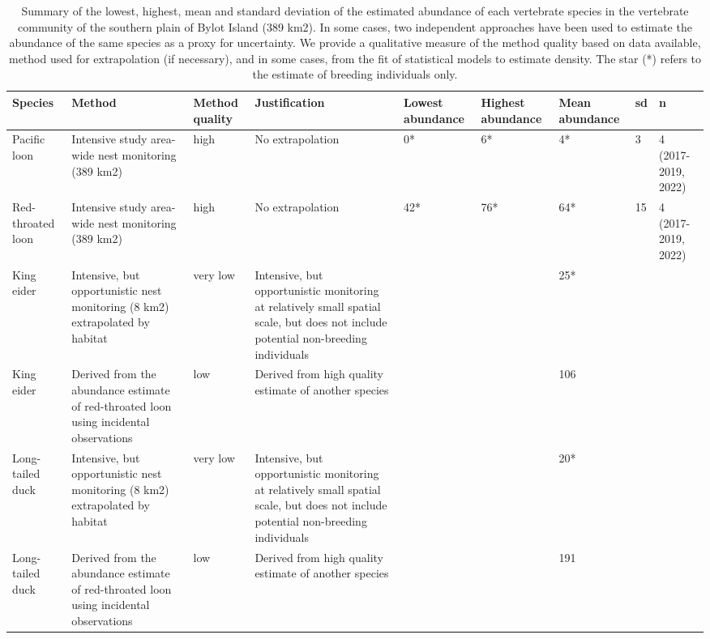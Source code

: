 \begingroup\fontsize{8pt}{10pt}\selectfont
\begin{longtable}{|p{}|p{}|p{}|p{}|p{}|p{}|p{}|p{}|p{}|}
\caption{Summary of the lowest, highest, mean and standard deviation of the estimated abundance of each vertebrate species in the vertebrate community of the southern plain of Bylot Island (389 km2). In some cases, two independent approaches have been used to estimate the abundance of the same species as a proxy for uncertainty. We provide a qualitative measure of the method quality based on data available, method used for extrapolation (if necessary), and in some cases, from the fit of statistical models to estimate density. The star (*) refers to the estimate of breeding individuals only.} \\ 
  \hline
{\textbf{Species}} & {\textbf{Method}} & {\textbf{Method quality}} & {\textbf{Justification}} & {\textbf{Lowest abundance}} & {\textbf{Highest abundance}} & {\textbf{Mean abundance}} & {\textbf{sd}} & {\textbf{n}} \\ 
  \hline
Pacific loon & Intensive study area-wide nest monitoring (389 km2) & high & No extrapolation & 0* & 6* & 4* & 3 & 4 (2017-2019, 2022) \\ 
   \hline
Red-throated loon & Intensive study area-wide nest monitoring (389 km2) & high & No extrapolation & 42* & 76* & 64* & 15 & 4 (2017-2019, 2022) \\ 
   \hline
King eider & Intensive, but opportunistic nest monitoring (8 km2) extrapolated by habitat & very low & Intensive, but opportunistic monitoring at relatively small spatial scale, but does not include potential non-breeding individuals &  &  & 25* &  &  \\ 
   \hline
King eider & Derived from the abundance estimate of red-throated loon using incidental observations & low & Derived from high quality estimate of another species &  &  & 106 &  &  \\ 
   \hline
Long-tailed duck & Intensive, but opportunistic nest monitoring (8 km2) extrapolated by habitat & very low & Intensive, but opportunistic monitoring at relatively small spatial scale, but does not include potential non-breeding individuals &  &  & 20* &  &  \\ 
   \hline
Long-tailed duck & Derived from the abundance estimate of red-throated loon using incidental observations & low & Derived from high quality estimate of another species &  &  & 191 &  &  \\ 

\end{longtable}
